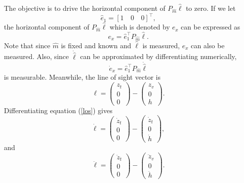 The objective is to drive the horizontal component of $P_{\hat{m}}\hat{\ell}$ to zero. If we let
\begin{equation}
\hat{e}_1=[1 \quad 0 \quad 0]^\top,
\label{e_1}
\end{equation}
the horizontal component of $P_{\hat{m}}\hat{\ell}$ which is denoted by $e_x$ can be expressed as
\begin{equation}
e_x=\hat{e}_1^{\top}P_{\hat{m}}\hat{\ell}.
\end{equation}
Note that since $\hat{m}$ is fixed and known and $\hat{\ell}$ is measured, $e_x$ can also be measured. Also, since $\dot{\hat{\ell}}$ can be approximated by differentiating numerically,
\begin{equation}
\dot{e}_x=\hat{e}_1^{\top}P_{\hat{m}}\dot{\hat{\ell}}
\label{exdot}
\end{equation} is measurable.
Meanwhile, the line of sight vector is
\begin{equation}
\ell=\begin{pmatrix} z_t \\ 0 \\ 0 \end{pmatrix}
-\begin{pmatrix} z_v \\ 0 \\ h \end{pmatrix}.
\label{los}
\end{equation}
Differentiating equation (\ref{los}) gives 
\begin{equation}
\dot{\ell}=\begin{pmatrix} \dot{z}_t \\ 0 \\ 0 \end{pmatrix}
-\begin{pmatrix} \dot{z}_t \\ 0 \\ \dot{h} \end{pmatrix},
\end{equation}
and
\begin{equation}
\ddot{\ell}=\begin{pmatrix} \ddot{z}_t \\ 0 \\ 0 \end{pmatrix}
-\begin{pmatrix} \ddot{z}_v \\ 0 \\ \ddot{h} \end{pmatrix}.
\end{equation}
